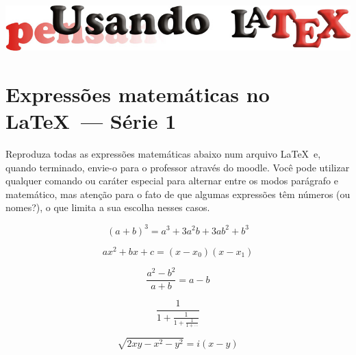 \documentclass[a4paper,10pt,twocolumn,landscape]{article}
\begin{document}
\begin{center}\includegraphics[width=0.8\columnwidth]{../figuras/LogotipoCursoLaTeX_v2}\end{center}

	\section*{Expressões matemáticas no \LaTeX\ --- Série 1}

	Reproduza todas as expressões matemáticas abaixo num arquivo \LaTeX\ e, quando terminado, envie-o para o professor através do moodle. Você pode utilizar qualquer comando ou caráter especial para alternar entre os modos parágrafo e matemático, mas atenção para o fato de que algumas expressões têm números (ou nomes?), o que limita a sua escolha nesses casos.
	
	\bigskip
	
	\begin{exercicio}
	
		\[
		\left(a + b\right)^3 = a^3 + 3 a^2 b + 3 a b^2 + b^3
		\]	
	\end{exercicio}
	
	\begin{exercicio}
	
		\begin{equation}\label{prod:notavel}
		ax^2 + bx + c = \left(x - x_0\right)\left(x - x_1\right)
		\end{equation}
	\end{exercicio}
	

	\begin{exercicio}
	
		\[
		\frac{a^2 - b^2}{a + b} = a - b
		\]
	\end{exercicio}
	

	\begin{exercicio}
	
		\[
		\frac{1}{1 + \frac{1}{1 + \frac{1}{1 + \cdots}}}
		\]
	\end{exercicio}
	
	
	\begin{exercicio}
	
		\[
		\sqrt{2xy - x^2 - y^2} = i(x-y)
		\]
	\end{exercicio}
	
\end{document}
